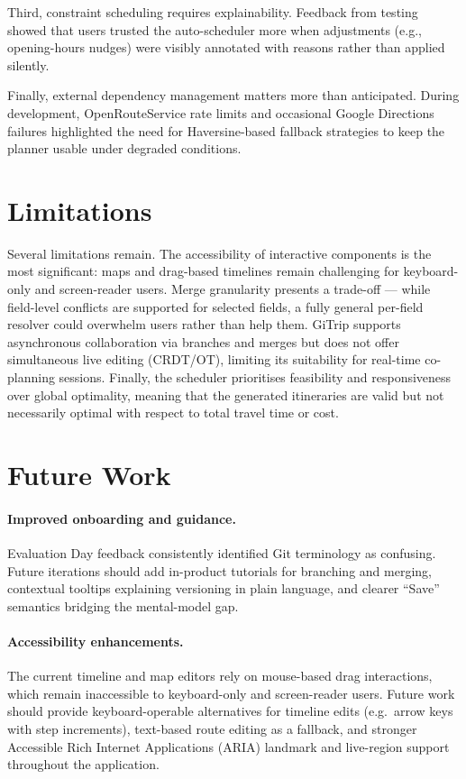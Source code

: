 Third, constraint scheduling requires explainability. Feedback from testing
showed that users trusted the auto-scheduler more when adjustments (e.g.,
opening-hours nudges) were visibly annotated with reasons rather than applied
silently.

Finally, external dependency management matters more than anticipated. During development, OpenRouteService rate limits and occasional Google Directions failures highlighted the need for Haversine-based fallback strategies to keep the planner usable under degraded conditions.

\section{Limitations}
Several limitations remain. The accessibility of interactive components is the
most significant: maps and drag-based timelines remain challenging for
keyboard-only and screen-reader users. Merge granularity presents a trade-off ---
while field-level conflicts are supported for selected fields, a fully general
per-field resolver could overwhelm users rather than help them. GiTrip supports
asynchronous collaboration via branches and merges but does not offer
simultaneous live editing (CRDT/OT), limiting its suitability for real-time
co-planning sessions. Finally, the scheduler prioritises feasibility and
responsiveness over global optimality, meaning that the generated itineraries are
valid but not necessarily optimal with respect to total travel time or cost.

\section{Future Work}
\paragraph{Improved onboarding and guidance.}
Evaluation Day feedback consistently identified Git terminology as confusing. Future iterations should add in-product tutorials for branching and merging, contextual tooltips explaining versioning in plain language, and clearer ``Save'' semantics bridging the mental-model gap.

\paragraph{Accessibility enhancements.}
The current timeline and map editors rely on mouse-based drag interactions, which
remain inaccessible to keyboard-only and screen-reader users. Future work should
provide keyboard-operable alternatives for timeline edits (e.g.\ arrow keys with
step increments), text-based route editing as a fallback, and stronger Accessible Rich Internet Applications (ARIA)
landmark and live-region support throughout the application.

